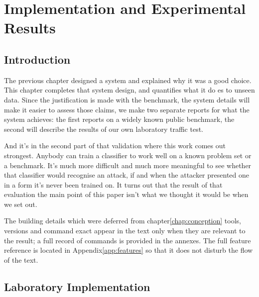 
\chapter{Implementation and Experimental Results}
\label{chap:results}

\section{Introduction}
\label{sec:results_intro}

The previous chapter designed a system and explained why it was a good choice. This chapter completes that system design, and quantifies what it do es to unseen data. Since the justification is made with the benchmark, the system details will make it easier to assess those claims, we make two separate reports for what the system achieves: the first reports on a widely known public benchmark, the second will describe the results of our own laboratory traffic test.

And it's in the second part of that validation where this work comes out strongest. Anybody can train a classifier to work well on a known problem set or a benchmark. It's much more difficult and much more meaningful to see whether that classifier would recognise an attack, if and when the attacker presented one in a form it's never been trained on. It turns out that the result of that evaluation the main point of this paper isn't what we thought it would be when we set out.

The building details which were deferred from chapter\ref{chap:conception} tools, versions and command exact appear in the text only when they are relevant to the result; a full record of commands is provided in the annexes. The full feature reference is located in Appendix\ref{app:features} so that it does not disturb the flow of the text.

\section{Laboratory Implementation}
\label{sec:results_lab}

